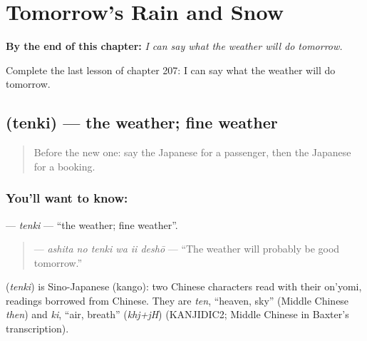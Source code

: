 
\chapter{Tomorrow's Rain and Snow}
\label{ch:ja-tomorrow-s-rain-and-snow}

\begin{chapteropening}
\textbf{By the end of this chapter:} \emph{I can say what the weather will do tomorrow.}

Complete the last lesson of chapter 207: I can say what the weather will do tomorrow.
\end{chapteropening}

\section[\texorpdfstring{\ja{てんき} (tenki)}{てんき (tenki)}]{ (tenki) — the weather; fine weather}

\label{lesson:JA-C207-tenki}



\begin{quote}
Before the new one: say the Japanese for a passenger, then the Japanese for a booking.
\end{quote}

\subsection*{You'll want to know: }
\textbf{} — \emph{tenki} — \textquotedblleft{}the weather; fine weather\textquotedblright{}.

\begin{quote}
\textbf{  } — \emph{ashita no tenki wa ii deshō} — \textquotedblleft{}The weather will probably be good tomorrow.\textquotedblright{}
\end{quote}

\begin{cousinweb}
\textbf{} (\emph{tenki}) is Sino-Japanese (kango): two Chinese characters read with their on'yomi, readings borrowed from Chinese. They are \emph{ten}, \textquotedblleft{}heaven, sky\textquotedblright{} (Middle Chinese \emph{then}) and \emph{ki}, \textquotedblleft{}air, breath\textquotedblright{} (\emph{khj+jH}) (KANJIDIC2; Middle Chinese in Baxter's transcription).
\end{cousinweb}

